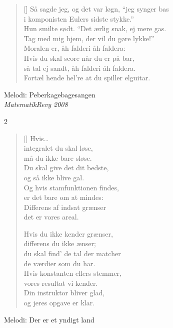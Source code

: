 \begin{multicols}{2}
\begin{verse}[\versewidth]
Så sagde jeg, og det var løgn, ``jeg synger bas\\
i komponisten Eulers sidste stykke.''\\
Hun smilte sødt. ``Det ærlig snak, ej mere gas.\\
Tag med mig hjem, der vil du gøre lykke!''\\
Moralen er, åh falderi åh faldera:\\
Hvis du skal score når du er på bar,\\
så tal ej sandt, åh falderi åh faldera.\\
Fortæl hende hel're at du spiller elguitar.
\end{verse}
\end{multicols}

{Melodi: Peberkagebagesangen}\\[.2em]
{\small\itshape MatematikRevy 2008}

\begin{multicols}2
\settowidth{\versewidth}{du skal find’ de tal der matcher}
\begin{verse}[\versewidth]
Hvis\ldots\\
integralet du skal løse,\\
må du ikke bare sløse.\\
Du skal give det dit bedste,\\
og så ikke blive gal.\\
Og hvis stamfunktionen findes,\\
er det bare om at mindes:\\
Differens af indsat grænser\\
det er vores areal.

Hvis du ikke kender grænser,\\
differens du ikke ænser;\\
du skal find’ de tal der matcher\\
de værdier som du har.\\
Hvis konstanten ellers stemmer,\\
vores resultat vi kender.\\
Din instruktor bliver glad,\\
og jeres opgave er klar.
\end{verse}
\end{multicols}


\newpage




{Melodi: Der er et yndigt land}\\[.2em]


